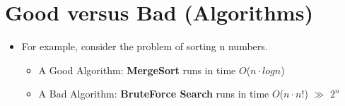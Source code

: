 \documentclass[12pt]{article}
\begin{document}
\section{Good versus Bad (Algorithms)}
\renewcommand{\labelitemii}{$\circ$}
\renewcommand{\labelitemiii}{$\cdot$}
\renewcommand{\labelitemiii}{$\rightarrow$}
\renewcommand{\labelitemiv}{$\star$}
\begin{itemize}
\item For example, consider the problem of sorting n numbers.
	\begin{itemize}
	\item A Good Algorithm: \textbf{MergeSort} runs in time $O$($n \cdot log{}n$)
	\item A Bad Algorithm: \textbf{BruteForce Search} runs in time $O$($n \cdot n!$) \(\gg\) $2^n$
	\end{itemize}
\end{itemize}
\end{document}
